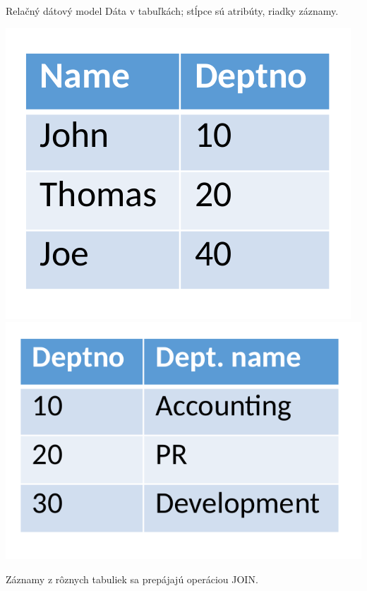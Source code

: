 \documentclass[12pt]{beamer}
\begin{document}
\begin{frame}{Relačný dátový model}
Dáta v tabuľkách; stĺpce sú atribúty, riadky záznamy.

\includegraphics[scale=.25]{rel1.png}
\includegraphics[scale=.25]{rel2.png}

Záznamy z rôznych tabuliek sa prepájajú operáciou JOIN.
\end{frame}
\end{document}
